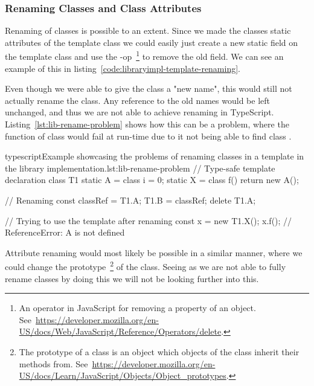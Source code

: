 
\subsubsection{Renaming Classes and Class Attributes}\label{subsubsec:renaming-classes-and-class-attributes}

Renaming of classes is possible to an extent.
Since we made the classes static attributes of the template class we could easily just create a new static field on the template class and use the -op~\footnote{An operator in JavaScript for removing a property of an object. See~\url{https://developer.mozilla.org/en-US/docs/Web/JavaScript/Reference/Operators/delete}.} to remove the old field.
We can see an example of this in listing~\vref{code:libraryimpl-template-renaming}.



Even though we were able to give the class a "new name", this would still not actually rename the class.
Any reference to the old names would be left unchanged, and thus we are not able to achieve renaming in TypeScript.
Listing~\vref{lst:lib-rename-problem} shows how this can be a problem, where the function  of class  would fail at run-time due to it not being able to find class .

\begin{code}{typescript}{Example showcasing the problems of renaming classes in a template in the library implementation.}{lst:lib-rename-problem}
    // Type-safe template declaration
    class T1 {
        static A = class {
            i = 0;
        }
        static X = class {
            f() {
                return new A();
            }
        }
    }

   // Renaming
    const classRef = T1.A;
    T1.B = classRef;
    delete T1.A;

    // Trying to use the template after renaming
    const x = new T1.X();
    x.f(); // ReferenceError: A is not defined
\end{code}

Attribute renaming would most likely be possible in a similar manner, where we could change the prototype~\footnote{The prototype of a class is an object which objects of the class inherit their methods from. See~\url{https://developer.mozilla.org/en-US/docs/Learn/JavaScript/Objects/Object_prototypes}.} of the class.
Seeing as we are not able to fully rename classes by doing this we will not be looking further into this.

